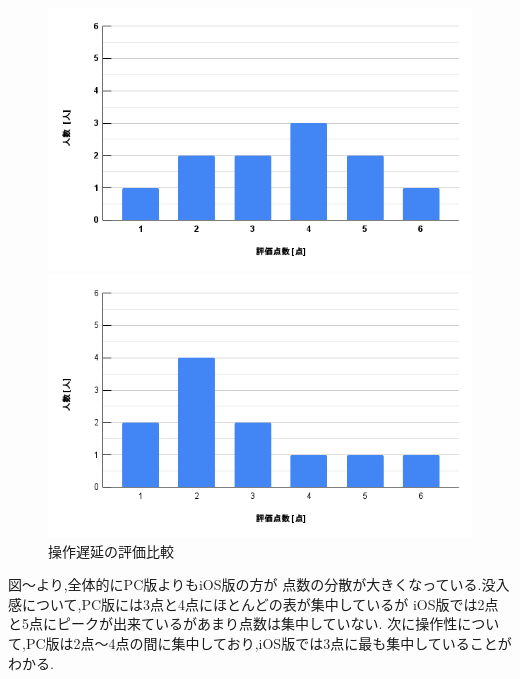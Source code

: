 \documentclass{ltjsreport}
\begin{document}
		\begin{figure}[H]
		\centering
		\begin{minipage}{0.45\columnwidth}
		\centering
		\includegraphics[width = \columnwidth]{../figs/PC-3.png}
		\end{minipage}
		\hspace{0.04\columnwidth}
		\begin{minipage}{0.45\columnwidth}
		\centering
		\includegraphics[width = \columnwidth]{../figs/iOS-3.png}
		\end{minipage}
		\caption{操作遅延の評価比較}
		\label{fig:tien}
		\end{figure}
		\vspace{-15pt}
		図～より,全体的にPC版よりもiOS版の方が
		点数の分散が大きくなっている.没入感について,PC版には3点と4点にほとんどの表が集中しているが
		iOS版では2点と5点にピークが出来ているがあまり点数は集中していない.
		次に操作性について,PC版は2点～4点の間に集中しており,iOS版では3点に最も集中していることがわかる.
\end{document}
